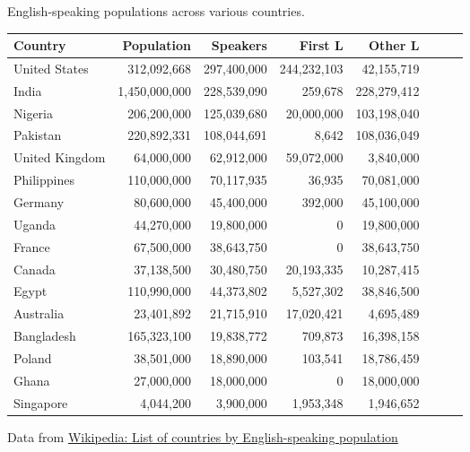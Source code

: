 \documentclass{beamer}
\begin{document}
\begin{frame}{English-speaking populations across various countries.}
  \begin{center}
\small
\begin{tabular}{lrrrrrrr}
  \textbf{Country} & \textbf{ Population} & \textbf{Speakers }  & \textbf{First L}  & \textbf{Other L}  \\ \hline
United States & 312,092,668 & 297,400,000 & 244,232,103 & 42,155,719 \\ 
India & 1,450,000,000 & 228,539,090 & 259,678 & 228,279,412 \\ 
Nigeria & 206,200,000 & 125,039,680 & 20,000,000 & 103,198,040  \\ 
Pakistan & 220,892,331 & 108,044,691 & 8,642 & 108,036,049  \\ 
United Kingdom & 64,000,000 & 62,912,000 & 59,072,000 & 3,840,000 \\ 
Philippines & 110,000,000 & 70,117,935 & 36,935 & 70,081,000  \\ 
Germany & 80,600,000 & 45,400,000 & 392,000 & 45,100,000  \\ 
Uganda & 44,270,000 & 19,800,000 & 0 & 19,800,000  \\ 
France & 67,500,000 & 38,643,750 & 0 & 38,643,750  \\ 
Canada & 37,138,500 & 30,480,750 & 20,193,335 & 10,287,415  \\ 
Egypt & 110,990,000 & 44,373,802 & 5,527,302 & 38,846,500  \\ 
Australia & 23,401,892 & 21,715,910 & 17,020,421 & 4,695,489  \\ 
Bangladesh & 165,323,100 & 19,838,772 & 709,873 & 16,398,158 \\ 
Poland & 38,501,000 & 18,890,000 & 103,541 & 18,786,459  \\ 
Ghana & 27,000,000 & 18,000,000 & 0 & 18,000,000  \\[1ex] 
Singapore & 4,044,200 & 3,900,000 & 1,953,348 & 1,946,652 
\end{tabular}
    
\end{center}
{\footnotesize Data from  \href{https://en.wikipedia.org/wiki/List_of_countries_by_English-speaking_population}{Wikipedia: List of countries by English-speaking population}}
\end{frame}
\end{document}
